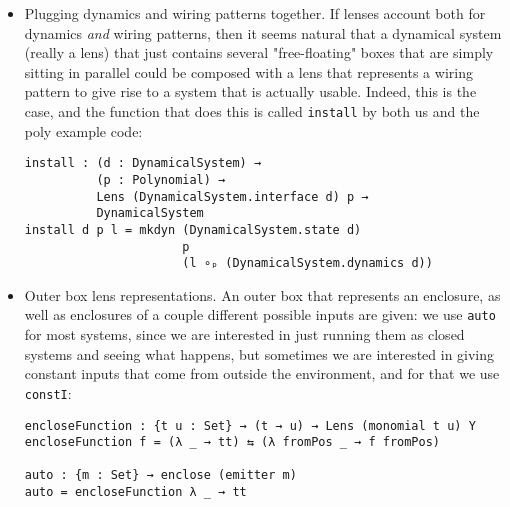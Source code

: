 \begin{itemize}
\begin{verbatim}
\end{verbatim}


    \item Plugging dynamics and wiring patterns together. If lenses account both for dynamics \textit{and} wiring patterns, then it seems natural that a dynamical system (really a lens) that just contains several "free-floating" boxes that are simply sitting in parallel could be composed with a lens that represents a wiring pattern to give rise to a system that is actually usable. Indeed, this is the case, and the function that does this is called \texttt{install} by both us and the poly example code:
    \begin{verbatim}
install : (d : DynamicalSystem) → 
          (p : Polynomial) → 
          Lens (DynamicalSystem.interface d) p → 
          DynamicalSystem
install d p l = mkdyn (DynamicalSystem.state d)
                      p 
                      (l ∘ₚ (DynamicalSystem.dynamics d))
\end{verbatim}
    \item Outer box lens representations. An outer box that represents an enclosure, as well as enclosures of a couple different possible inputs are given: we use \texttt{auto} for most systems, since we are interested in just running them as closed systems and seeing what happens, but sometimes we are interested in giving constant inputs that come from outside the environment, and for that we use \texttt{constI}:
\begin{verbatim}
encloseFunction : {t u : Set} → (t → u) → Lens (monomial t u) Y
encloseFunction f = (λ _ → tt) ⇆ (λ fromPos _ → f fromPos)

auto : {m : Set} → enclose (emitter m)
auto = encloseFunction λ _ → tt


\end{verbatim}
\end{itemize}
